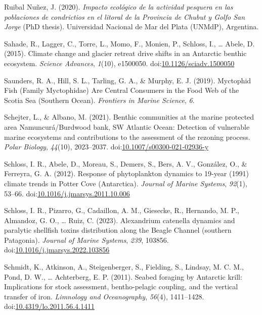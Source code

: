 \documentclass[
]{article}
\newlength{\cslhangindent}
\newenvironment{CSLReferences}[2] %
 {\begin{list}{}{%
  \setlength{\itemindent}{0pt}
  \setlength{\leftmargin}{0pt}
  \setlength{\parsep}{0pt}
  \ifodd #1
   \setlength{\leftmargin}{\cslhangindent}
   \setlength{\itemindent}{-1\cslhangindent}
  \fi
  \setlength{\itemsep}{#2\baselineskip}}}
 {\end{list}}
\begin{document}
\begin{CSLReferences}{1}{0}
Ruibal Nuñez, J. (2020). \emph{{Impacto ecológico de la actividad
pesquera en las poblaciones de condrictios en el litoral de la Provincia
de Chubut y Golfo San Jorge}} (PhD thesis). Universidad Nacional de Mar
del Plata (UNMdP), {Argentina}.

Sahade, R., Lagger, C., Torre, L., Momo, F., Monien, P., Schloss, I.,
\ldots{} Abele, D. (2015). Climate change and glacier retreat drive
shifts in an {Antarctic} benthic ecosystem. \emph{Science Advances},
\emph{1}(10), e1500050.
doi:\href{https://doi.org/10.1126/sciadv.1500050}{10.1126/sciadv.1500050}

Saunders, R. A., Hill, S. L., Tarling, G. A., \& Murphy, E. J. (2019).
Myctophid {Fish} ({Family Myctophidae}) {Are Central Consumers} in the
{Food Web} of the {Scotia Sea} ({Southern Ocean}). \emph{Frontiers in
Marine Science}, \emph{6}.

Schejter, L., \& Albano, M. (2021). Benthic communities at the marine
protected area {Namuncurá}/{Burdwood} bank, {SW Atlantic Ocean}:
Detection of vulnerable marine ecosystems and contributions to the
assessment of the rezoning process. \emph{Polar Biology}, \emph{44}(10),
2023--2037.
doi:\href{https://doi.org/10.1007/s00300-021-02936-y}{10.1007/s00300-021-02936-y}

Schloss, I. R., Abele, D., Moreau, S., Demers, S., Bers, A. V.,
González, O., \& Ferreyra, G. A. (2012). Response of phytoplankton
dynamics to 19-year (1991) climate trends in {Potter
Cove} ({Antarctica}). \emph{Journal of Marine Systems}, \emph{92}(1),
53--66.
doi:\href{https://doi.org/10.1016/j.jmarsys.2011.10.006}{10.1016/j.jmarsys.2011.10.006}

Schloss, I. R., Pizarro, G., Cadaillon, A. M., Giesecke, R., Hernando,
M. P., Almandoz, G. O., \ldots{} Ruiz, C. (2023). Alexandrium catenella
dynamics and paralytic shellfish toxins distribution along the {Beagle
Channel} (southern {Patagonia}). \emph{Journal of Marine Systems},
\emph{239}, 103856.
doi:\href{https://doi.org/10.1016/j.jmarsys.2022.103856}{10.1016/j.jmarsys.2022.103856}

Schmidt, K., Atkinson, A., Steigenberger, S., Fielding, S., Lindsay, M.
C. M., Pond, D. W., \ldots{} Achterberg, E. P. (2011). Seabed foraging
by {Antarctic} krill: {Implications} for stock assessment,
bentho-pelagic coupling, and the vertical transfer of iron.
\emph{Limnology and Oceanography}, \emph{56}(4), 1411--1428.
doi:\href{https://doi.org/10.4319/lo.2011.56.4.1411}{10.4319/lo.2011.56.4.1411}


\end{CSLReferences}
\end{document}
